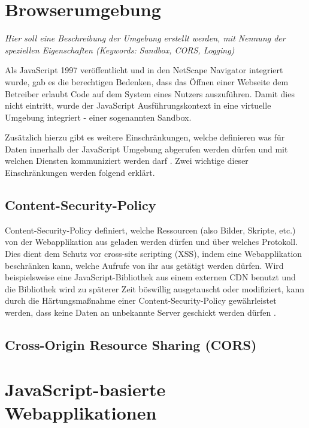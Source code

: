 \section{Browserumgebung}

\textit{Hier soll eine Beschreibung der Umgebung erstellt werden, mit Nennung der speziellen Eigenschaften (Keywords: Sandbox, CORS, Logging)}

Als JavaScript 1997 veröffentlicht und in den NetScape Navigator integriert wurde, gab es die berechtigen Bedenken, dass das Öffnen einer Webseite dem Betreiber erlaubt Code auf dem System eines Nutzers auszuführen. Damit dies nicht eintritt, wurde der JavaScript Ausführungskontext in eine virtuelle Umgebung  integriert - einer sogenannten Sandbox. \cite{LearningJavaScript}

Zusätzlich hierzu gibt es weitere Einschränkungen, welche definieren was für Daten innerhalb der JavaScript Umgebung abgerufen werden dürfen und mit welchen Diensten kommuniziert werden darf \cite{LearningJavaScript}. Zwei wichtige dieser Einschränkungen werden folgend erklärt.

\subsection{Content-Security-Policy}

Content-Security-Policy definiert, welche Ressourcen (also Bilder, Skripte, etc.) von der Webapplikation aus geladen werden dürfen und über welches Protokoll. Dies dient dem Schutz vor cross-site scripting (XSS), indem eine Webapplikation beschränken kann, welche Aufrufe von ihr aus getätigt werden dürfen. Wird beispielsweise eine JavaScript-Bibliothek aus einem externen CDN benutzt und die Bibliothek wird zu späterer Zeit böswillig ausgetauscht oder modifiziert, kann durch die Härtungsmaßnahme einer Content-Security-Policy gewährleistet werden, dass keine Daten an unbekannte Server geschickt werden dürfen \cite{MDNContentSecurityPolicy}.

\subsection{Cross-Origin Resource Sharing (CORS)}

\section{JavaScript-basierte Webapplikationen}

	
